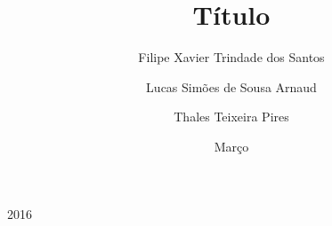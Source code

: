 \documentclass{projetofinal-dcc}
\begin{document}
\title{Título}

\author{Filipe Xavier Trindade dos Santos }{}
\author{Lucas Simões de Sousa Arnaud }{}
\author{Thales Teixeira Pires}{}





\date{Março}{2016}
\maketitle

\startdocument
\makethankspage

\begin{abstract}{
  
}
\end{abstract}

\begin{englishabstract}{
  
}
\end{englishabstract}

\makefigurespage

\maketablespage

\makelistingspage

\makeabrevpage{}
\end{document}
